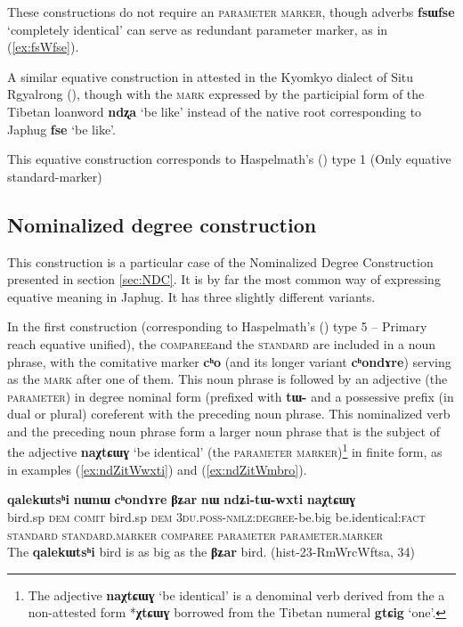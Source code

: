 \documentclass[oneside,a4paper,11pt]{article}
\newcommand{\ipa}[1]{{\phon\textbf{#1}}} %
\newcommand{\forme}[2]{\ipa{#1} `#2'}
\begin{document}
These constructions do not require an \textsc{parameter marker}, though adverbs \forme{fsɯfse}{completely identical} can serve as redundant parameter marker, as in (\ref{ex:fsWfse}).

A similar equative construction in attested in the Kyomkyo dialect of Situ Rgyalrong (\citealt[238]{prins11kyomkyo}), though with the \textsc{mark} expressed by the participial form of the Tibetan loanword \forme{ndʐa}{be like} instead of the native root corresponding to Japhug \forme{fse}{be like}.

This equative construction corresponds to Haspelmath's (\citeyear{haspelmath17equative}) type 1 (Only equative standard-marker)

\subsection{Nominalized degree construction} \label{sec:NDC.equative}
This construction is a particular case of the Nominalized Degree Construction presented in section \ref{sec:NDC}. It is by far the most common way of expressing equative meaning in Japhug. It has three slightly different variants. 

In the first construction (corresponding to Haspelmath's (\citeyear{haspelmath17equative}) type 5 -- Primary reach equative unified), the \textsc{comparee}and the \textsc{standard} are included in a noun phrase, with the comitative marker \ipa{cʰo} (and its longer variant \ipa{cʰondɤre}) serving as the \textsc{mark} after one of them. This noun phrase is followed by an adjective (the \textsc{parameter}) in degree nominal form (prefixed with \ipa{tɯ-} and a possessive prefix (in dual or plural) coreferent with the preceding noun phrase. This nominalized verb and the preceding noun phrase form a larger noun phrase that is the subject of the adjective \forme{naχtɕɯɣ}{be identical} (the \textsc{parameter marker})\footnote{The adjective \forme{naχtɕɯɣ}{be identical} is a denominal verb derived from the a non-attested form *\ipa{χtɕɯɣ} borrowed from the Tibetan numeral \forme{gtɕig}{one}. } in finite form, as in examples (\ref{ex:ndZitWwxti}) and (\ref{ex:ndZitWmbro}).

\begin{exe}
\ex \label{ex:ndZitWwxti}
\glll
\ipa{qalekɯtsʰi} 	\ipa{nɯnɯ} 	\ipa{cʰondɤre} 	\ipa{βʑar} 	\ipa{nɯ} 	\ipa{ndʑi-tɯ-wxti} 	\ipa{naχtɕɯɣ} \\
bird.sp \textsc{dem} \textsc{comit} bird.sp \textsc{dem} \textsc{3du.poss-nmlz:degree}-be.big be.identical:\textsc{fact} \\
{\textsc{standard}} { } \textsc{standard.marker} {\textsc{comparee}} { } \textsc{parameter} \textsc{parameter.marker} \\
\glt The \ipa{qalekɯtsʰi} bird is as big as the \ipa{βʑar} bird. (hist-23-RmWrcWftsa, 34)
\end{exe}
\end{document}
